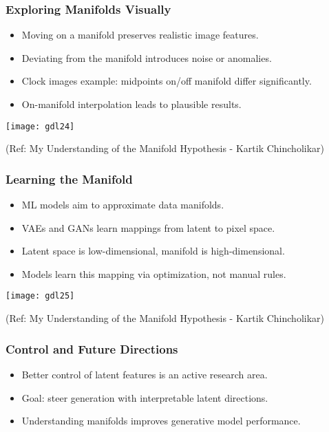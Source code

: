 \begin{frame}[fragile]\frametitle{Exploring Manifolds Visually}
    \begin{itemize}
        \item Moving on a manifold preserves realistic image features.
        \item Deviating from the manifold introduces noise or anomalies.
        \item Clock images example: midpoints on/off manifold differ significantly.
        \item On-manifold interpolation leads to plausible results.
    \end{itemize}
	
\begin{center}
\texttt{[image: gdl24]}

{\tiny (Ref: My Understanding of the Manifold Hypothesis - Kartik Chincholikar)}	

\end{center}		
\end{frame}

\begin{frame}[fragile]\frametitle{Learning the Manifold}
    \begin{itemize}
        \item ML models aim to approximate data manifolds.
        \item VAEs and GANs learn mappings from latent to pixel space.
        \item Latent space is low-dimensional, manifold is high-dimensional.
        \item Models learn this mapping via optimization, not manual rules.
    \end{itemize}
	
\begin{center}
\texttt{[image: gdl25]}

{\tiny (Ref: My Understanding of the Manifold Hypothesis - Kartik Chincholikar)}	

\end{center}	
\end{frame}

\begin{frame}[fragile]\frametitle{Control and Future Directions}
    \begin{itemize}
        \item Better control of latent features is an active research area.
        \item Goal: steer generation with interpretable latent directions.
        \item Understanding manifolds improves generative model performance.
    \end{itemize}
\end{frame}
